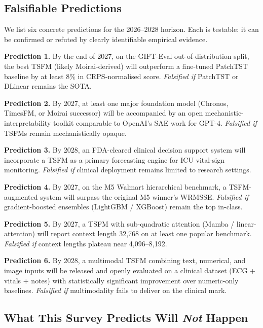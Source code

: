 \subsection{Falsifiable Predictions}\label{falsifiable-predictions}

We list six concrete predictions for the 2026--2028 horizon. Each is testable: it can be confirmed or refuted by clearly identifiable empirical evidence.

\textbf{Prediction 1.} By the end of 2027, on the GIFT-Eval out-of-distribution split, the best TSFM (likely Moirai-derived) will outperform a fine-tuned PatchTST baseline by at least 8\% in CRPS-normalised score. \emph{Falsified if} PatchTST or DLinear remains the SOTA.

\textbf{Prediction 2.} By 2027, at least one major foundation model (Chronos, TimesFM, or Moirai successor) will be accompanied by an open mechanistic-interpretability toolkit comparable to OpenAI's SAE work for GPT-4. \emph{Falsified if} TSFMs remain mechanistically opaque.

\textbf{Prediction 3.} By 2028, an FDA-cleared clinical decision support system will incorporate a TSFM as a primary forecasting engine for ICU vital-sign monitoring. \emph{Falsified if} clinical deployment remains limited to research settings.

\textbf{Prediction 4.} By 2027, on the M5 Walmart hierarchical benchmark, a TSFM-augmented system will surpass the original M5 winner's WRMSSE. \emph{Falsified if} gradient-boosted ensembles (LightGBM / XGBoost) remain the top in-class.

\textbf{Prediction 5.} By 2027, a TSFM with sub-quadratic attention (Mamba / linear-attention) will report context length 32,768 on at least one popular benchmark. \emph{Falsified if} context lengths plateau near 4,096--8,192.

\textbf{Prediction 6.} By 2028, a multimodal TSFM combining text, numerical, and image inputs will be released and openly evaluated on a clinical dataset (ECG + vitals + notes) with statistically significant improvement over numeric-only baselines. \emph{Falsified if} multimodality fails to deliver on the clinical mark.

\subsection{\texorpdfstring{What This Survey Predicts Will \emph{Not} Happen}{What This Survey Predicts Will Not Happen}}\label{what-this-survey-predicts-will-not-happen}

